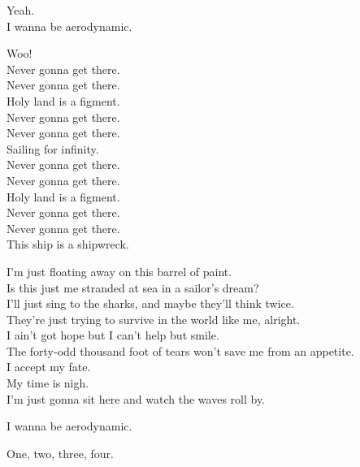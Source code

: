 Yeah. \\
I wanna be aerodynamic. \\


Woo! \\
Never gonna get there. \\
Never gonna get there. \\
Holy land is a figment. \\
Never gonna get there. \\
Never gonna get there. \\
Sailing for infinity. \\
Never gonna get there. \\
Never gonna get there. \\
Holy land is a figment. \\
Never gonna get there. \\
Never gonna get there. \\
This ship is a shipwreck. \\


I'm just floating away on this barrel of paint. \\
Is this just me stranded at sea in a sailor's dream? \\
I'll just sing to the sharks, and maybe they'll think twice. \\
They're just trying to survive in the world like me, alright. \\
I ain't got hope but I can't help but smile. \\
The forty-odd thousand foot of tears won't save me from an appetite. \\
I accept my fate. \\
My time is nigh. \\
I'm just gonna sit here and watch the waves roll by. \\


I wanna be aerodynamic. \\





One, two, three, four. \\

